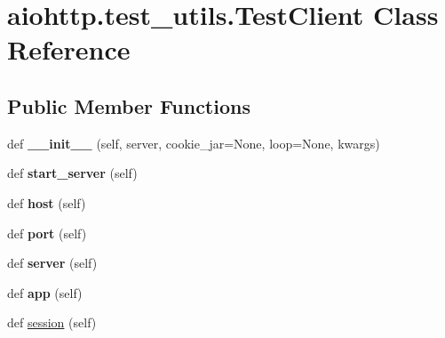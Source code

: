 \hypertarget{classaiohttp_1_1test__utils_1_1_test_client}{}\section{aiohttp.\+test\+\_\+utils.\+Test\+Client Class Reference}
\label{classaiohttp_1_1test__utils_1_1_test_client}
\subsection*{Public Member Functions}
\begin{DoxyCompactItemize}
\item 
\mbox{\label{classaiohttp_1_1test__utils_1_1_test_client_aad899e93fa6c19a98345e86013cca5d8}} 
def {\bfseries \+\_\+\+\_\+init\+\_\+\+\_\+} (self, server, cookie\+\_\+jar=None, loop=None, kwargs)
\item 
\mbox{\label{classaiohttp_1_1test__utils_1_1_test_client_a5bf3970e1f79dc2f1355e8deeabd0338}} 
def {\bfseries start\+\_\+server} (self)
\item 
\mbox{\label{classaiohttp_1_1test__utils_1_1_test_client_ae393aee14bd99ee499809952ef6b83e1}} 
def {\bfseries host} (self)
\item 
\mbox{\label{classaiohttp_1_1test__utils_1_1_test_client_a0178bd92a7de74e9af3dec594dcbcb3d}} 
def {\bfseries port} (self)
\item 
\mbox{\label{classaiohttp_1_1test__utils_1_1_test_client_a2100365a994c6dbac50b43c3164cc98a}} 
def {\bfseries server} (self)
\item 
\mbox{\label{classaiohttp_1_1test__utils_1_1_test_client_afea8eb88bd01592310fa5fde504777f1}} 
def {\bfseries app} (self)
\item 
def \hyperlink{classaiohttp_1_1test__utils_1_1_test_client_a1221146af3042654408d2e7401bf83d8}{session} (self)
\item 
\mbox{\label{classaiohttp_1_1test__utils_1_1_test_client_addd8f8a8f81f40eb2993dc94d2d2ed6f}} 

\end{DoxyCompactItemize}
